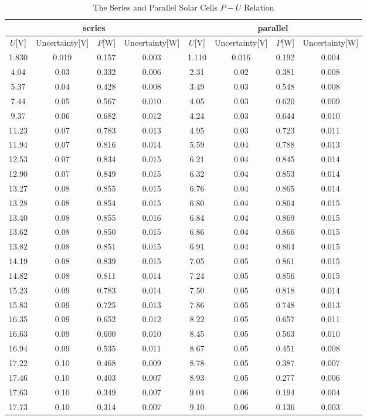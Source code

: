 \documentclass[a4paper]{article}
\begin{document}
    \begin{table}[H]
        \centering
        \begin{tabular}{|c|c|c|c||c|c|c|c|}
            \hline
            \multicolumn{4}{|c||}{series}&\multicolumn{4}{c|}{parallel}\\\hline
            $U$[V]&Uncertainty[V]&$P$[W]&Uncertainty[W]&$U$[V]&Uncertainty[V]&$P$[W]&Uncertainty[W]\\\hline
            1.830&0.019&0.157&0.003&1.110&0.016&0.192&0.004\\\hline
            4.04&0.03&0.332&0.006&2.31&0.02&0.381&0.008\\\hline
            5.37&0.04&0.428&0.008&3.49&0.03&0.548&0.008\\\hline
            7.44&0.05&0.567&0.010&4.05&0.03&0.620&0.009\\\hline
            9.37&0.06&0.682&0.012&4.24&0.03&0.644&0.010\\\hline
            11.23&0.07&0.783&0.013&4.95&0.03&0.723&0.011\\\hline
            11.94&0.07&0.816&0.014&5.59&0.04&0.788&0.013\\\hline
            12.53&0.07&0.834&0.015&6.21&0.04&0.845&0.014\\\hline
            12.90&0.07&0.849&0.015&6.32&0.04&0.853&0.014\\\hline
            13.27&0.08&0.855&0.015&6.76&0.04&0.865&0.014\\\hline
            13.28&0.08&0.854&0.015&6.80&0.04&0.864&0.015\\\hline
            13.40&0.08&0.855&0.016&6.84&0.04&0.869&0.015\\\hline
            13.62&0.08&0.850&0.015&6.86&0.04&0.866&0.015\\\hline
            13.82&0.08&0.851&0.015&6.91&0.04&0.864&0.015\\\hline
            14.19&0.08&0.839&0.015&7.05&0.05&0.861&0.015\\\hline
            14.82&0.08&0.811&0.014&7.24&0.05&0.856&0.015\\\hline
            15.23&0.09&0.783&0.014&7.50&0.05&0.818&0.014\\\hline
            15.83&0.09&0.725&0.013&7.86&0.05&0.748&0.013\\\hline
            16.35&0.09&0.652&0.012&8.22&0.05&0.657&0.011\\\hline
            16.63&0.09&0.600&0.010&8.45&0.05&0.563&0.010\\\hline
            16.94&0.09&0.535&0.011&8.67&0.05&0.451&0.008\\\hline
            17.22&0.10&0.468&0.009&8.78&0.05&0.387&0.007\\\hline
            17.46&0.10&0.403&0.007&8.93&0.05&0.277&0.006\\\hline
            17.63&0.10&0.349&0.007&9.04&0.06&0.194&0.004\\\hline
            17.73&0.10&0.314&0.007&9.10&0.06&0.136&0.003\\\hline
        \end{tabular}
        \caption{The Series and Parallel Solar Cells $P-U$ Relation}
        \label{tab:UPsp}
    \end{table}
\end{document}

